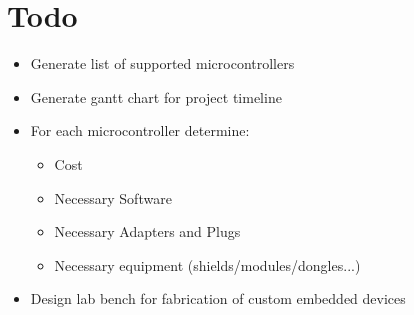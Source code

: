 \documentclass[12pt]{article}
\begin{document}
\section{Todo}
\begin{itemize}
\item Generate list of supported microcontrollers
\item Generate gantt chart for project timeline
\item For each microcontroller determine:
  \begin{itemize}
  \item Cost
  \item Necessary Software
  \item Necessary Adapters and Plugs
  \item Necessary equipment (shields/modules/dongles...)
  \end{itemize}
\item Design lab bench for fabrication of custom embedded devices
\end{itemize}
\end{document}
